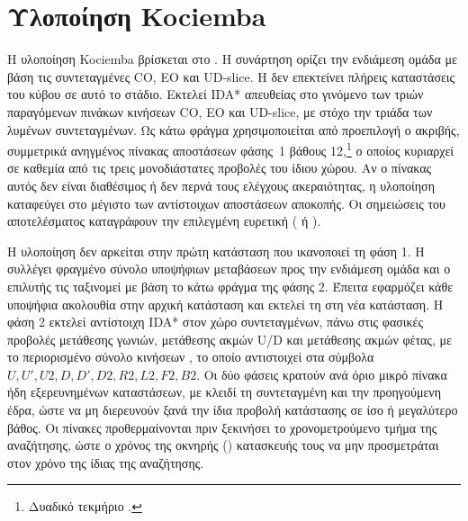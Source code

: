 \section{Υλοποίηση Kociemba}
\label{sec:implementation-kociemba}
Η υλοποίηση Kociemba βρίσκεται στο . Η συνάρτηση  ορίζει την ενδιάμεση ομάδα με βάση τις συντεταγμένες CO, EO και UD-slice. Η  δεν επεκτείνει πλήρεις καταστάσεις του κύβου σε αυτό το στάδιο. Εκτελεί IDA* απευθείας στο γινόμενο των τριών παραγόμενων πινάκων κινήσεων CO, EO και UD-slice, με στόχο την τριάδα των λυμένων συντεταγμένων. Ως κάτω φράγμα χρησιμοποιείται από προεπιλογή ο ακριβής, συμμετρικά ανηγμένος πίνακας αποστάσεων φάσης~1 βάθους 12,\footnote{Δυαδικό τεκμήριο .} ο οποίος κυριαρχεί σε καθεμία από τις τρεις μονοδιάστατες προβολές του ίδιου χώρου. Αν ο πίνακας αυτός δεν είναι διαθέσιμος ή δεν περνά τους ελέγχους ακεραιότητας, η υλοποίηση καταφεύγει στο μέγιστο των αντίστοιχων αποστάσεων αποκοπής. Οι σημειώσεις του αποτελέσματος καταγράφουν την επιλεγμένη ευρετική ( ή ).

Η υλοποίηση δεν αρκείται στην πρώτη κατάσταση που ικανοποιεί τη φάση 1. Η  συλλέγει φραγμένο σύνολο υποψήφιων μεταβάσεων προς την ενδιάμεση ομάδα και ο επιλυτής τις ταξινομεί με βάση το κάτω φράγμα της φάσης 2. Έπειτα εφαρμόζει κάθε υποψήφια ακολουθία στην αρχική κατάσταση και εκτελεί τη  στη νέα κατάσταση. Η φάση 2 εκτελεί αντίστοιχη IDA* στον χώρο συντεταγμένων, πάνω στις φασικές προβολές μετάθεσης γωνιών, μετάθεσης ακμών U/D και μετάθεσης ακμών φέτας, με το περιορισμένο σύνολο κινήσεων , το οποίο αντιστοιχεί στα σύμβολα \(U,U',U2,D,D',D2,R2,L2,F2,B2\). Οι δύο φάσεις κρατούν ανά όριο μικρό πίνακα ήδη εξερευνημένων καταστάσεων, με κλειδί τη συντεταγμένη και την προηγούμενη έδρα, ώστε να μη διερευνούν ξανά την ίδια προβολή κατάστασης σε ίσο ή μεγαλύτερο βάθος. Οι πίνακες προθερμαίνονται πριν ξεκινήσει το χρονομετρούμενο τμήμα της αναζήτησης, ώστε ο χρόνος της οκνηρής () κατασκευής τους να μην προσμετράται στον χρόνο της ίδιας της αναζήτησης.

